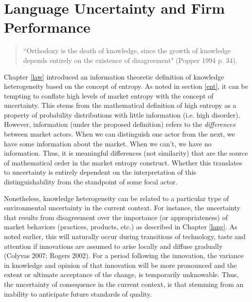 \chapter{Language Uncertainty and Firm Performance \label{signal}}


\begin{small}
\begin{quote}
``Orthodoxy is the death of knowledge, since the growth of knowledge depends entirely on the existence of disagreement" (Popper 1994 p. 34).
\end{quote}
\end{small}

Chapter \ref{law} introduced an information theoretic definition of knowledge heterogeneity based on the concept of entropy. As noted in section \ref{ent}, it can be tempting to conflate high levels of market entropy with the concept of uncertainty. This stems from the mathematical definition of high entropy as a property of probability distributions with little information (i.e. high disorder). However, information (under the proposed definition) refers to the \emph{differences} between market actors. When we can distinguish one actor from the next, we have some information about the market. When we can't, we have no information. Thus, it is meaningful differences (not similarity) that are the source of mathematical order in the market entropy construct. Whether this translates to uncertainty is entirely dependent on the interpretation of this distinguishability from the standpoint of some focal actor.

Nonetheless, knowledge heterogeneity can be related to a particular type of environmental uncertainty in the current context. For instance, the uncertainty that results from disagreement over the importance (or appropriateness) of market behaviors (practices, products, etc.) as described in Chapter \ref{lang}. As noted earlier, this will naturally occur during transitions of technology, taste and attention if innovations are assumed to arise locally and diffuse gradually (Colyvas 2007; Rogers 2002). For a period following the innovation, the variance in knowledge and opinion of that innovation will be more pronounced and the extent or ultimate acceptance of the change, is temporarily unknowable. Thus, the uncertainty of consequence in the current context, is that stemming from an inability to anticipate future standards of quality.

